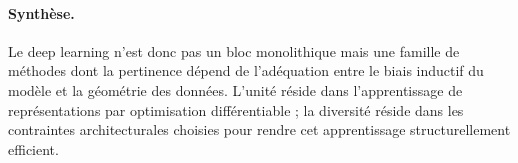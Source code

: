 \paragraph{Synthèse.}
Le deep learning n'est donc pas un bloc monolithique mais une famille de
méthodes dont la pertinence dépend de l'adéquation entre le biais inductif
du modèle et la géométrie des données. L'unité réside dans l'apprentissage
de représentations par optimisation différentiable ; la diversité réside dans
les contraintes architecturales choisies pour rendre cet apprentissage
structurellement efficient.
